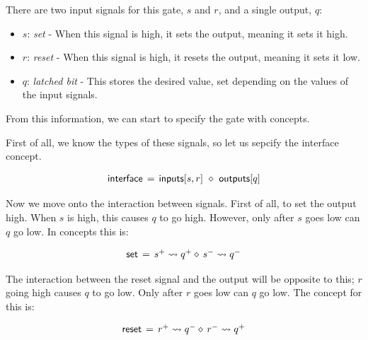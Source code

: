 \documentclass[british,conference,compsoc]{IEEEtran}
\begin{document}
\noindent There are two input signals for this gate, $s$ and $r$, and a single output, $q$: 

\begin{itemize}
  \item $s$: \emph{set} - When this signal is high, it sets the output, meaning it sets it high.
  \item $r$: \emph{reset} - When this signal is high, it resets the output, meaning it sets it low.
  \item $q$: \emph{latched bit} - This stores the desired value, set depending on the values of the input signals.
\end{itemize}

\noindent From this information, we can start to specify the gate with concepts.

First of all, we know the types of these signals, so let us sepcify the interface concept.


\[
\begin{array}{lcl}
\mathsf{interface}&\hspace{-2mm}=&\hspace{-2mm}\mathsf{inputs}[s, r]~\diamond~\mathsf{outputs}[q]
\end{array}
\]

\noindent Now we move onto the interaction between signals. First of all, to set the output high.
When $s$ is high, this causes $q$ to go high. However, only after $s$ goes low can $q$ go low.
In concepts this is: 


\[
\begin{array}{lcl}
\mathsf{set}&\hspace{-2mm}=&\hspace{-2mm}s^{+} \rightsquigarrow q^{+} \diamond\, s^{-} \rightsquigarrow q^{-}
\end{array}
\]

\noindent The interaction between the reset signal and the output will be opposite to this; $r$ going high causes $q$ 
to go low. Only after $r$ goes low can $q$ go low. The concept for this is:

\[
\begin{array}{lcl}
\mathsf{reset}&\hspace{-2mm}=&\hspace{-2mm}r^{+} \rightsquigarrow q^{-} \diamond\, r^{-} \rightsquigarrow q^{+}
\end{array}
\]
\end{document}
